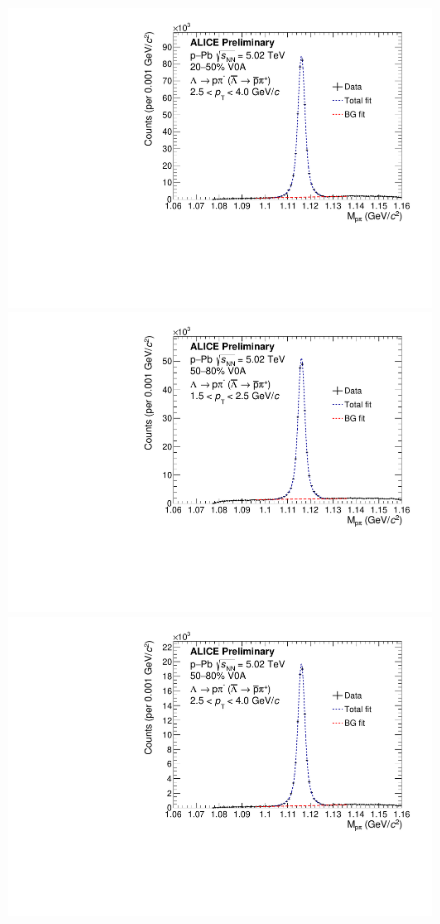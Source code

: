 \begin{figure}[ht]
\begin{minipage}{0.48\textwidth}
	\end{minipage}
	\begin{minipage}{0.48\textwidth}
		\includegraphics[width=\textwidth]{figures/analysis/lambda_mass_dist_20_50_highpt.pdf}
	\end{minipage}
	\begin{minipage}{0.48\textwidth}
		\includegraphics[width=\textwidth]{figures/analysis/lambda_mass_dist_50_80_lowpt.pdf}
	\end{minipage}
	\begin{minipage}{0.48\textwidth}
		\includegraphics[width=\textwidth]{figures/analysis/lambda_mass_dist_50_80_highpt.pdf}

\end{minipage}
\end{figure}
